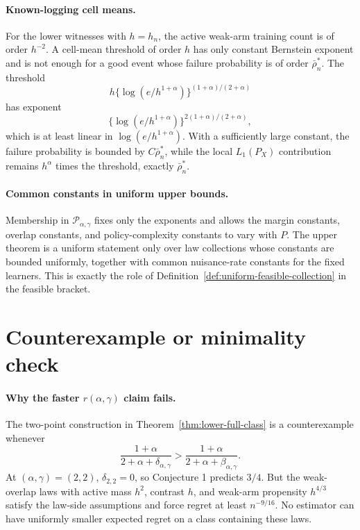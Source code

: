 \documentclass[11pt]{article}
\theoremstyle{definition}
\theoremstyle{plain}
\theoremstyle{remark}
\begin{document}
\paragraph{Known-logging cell means.}
For the lower witnesses with \(h=h_n\), the active weak-arm training count is
of order \(h^{-2}\).  A cell-mean threshold of order \(h\) has only constant
Bernstein exponent and is not enough for a good event whose failure
probability is of order \(\bar\rho_n^*\).  The threshold
\[
h\{\log(e/h^{1+\alpha})\}^{(1+\alpha)/(2+\alpha)}
\]
has exponent
\[
\{\log(e/h^{1+\alpha})\}^{2(1+\alpha)/(2+\alpha)},
\]
which is at least linear in \(\log(e/h^{1+\alpha})\).  With a sufficiently
large constant, the failure probability is bounded by
\(C\bar\rho_n^*\), while the local \(L_1(P_X)\) contribution remains
\(h^\alpha\) times the threshold, exactly \(\bar\rho_n^*\).

\paragraph{Common constants in uniform upper bounds.}
Membership in \(\mathcal P_{\alpha,\gamma}\) fixes only the exponents and
allows the margin constants, overlap constants, and policy-complexity
constants to vary with \(P\).  The upper theorem is a uniform statement only
over law collections whose constants are bounded uniformly, together with
common nuisance-rate constants for the fixed learners.  This is exactly the
role of Definition~\ref{def:uniform-feasible-collection} in the feasible
bracket.

\section{Counterexample or minimality check}
\paragraph{Why the faster \(r(\alpha,\gamma)\) claim fails.}
The two-point construction in Theorem~\ref{thm:lower-full-class} is a
counterexample whenever
\[
\frac{1+\alpha}{2+\alpha+\delta_{\alpha,\gamma}}
>
\frac{1+\alpha}{2+\alpha+\beta_{\alpha,\gamma}}.
\]
At \((\alpha,\gamma)=(2,2)\), \(\delta_{2,2}=0\), so Conjecture 1 predicts
\(3/4\).  But the weak-overlap laws with active mass \(h^2\), contrast
\(h\), and weak-arm propensity \(h^{4/3}\) satisfy the law-side assumptions
and force regret at least \(n^{-9/16}\).  No estimator can have uniformly
smaller expected regret on a class containing these laws.
\end{document}
